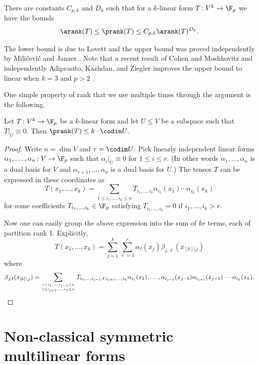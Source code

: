 \begin{thm}
\label{thm:analytic-partition}
There are constants $C_{p,k}$ and $D_k$ such that for a $k$-linear form $T\colon V^k\to\F_p$ we have the bounds
\[\arank(T)\leq\prank(T)\leq C_{p,k}\arank(T)^{D_k}.\]
\end{thm}

The lower bound is due to Lovett \cite{Lov19} and the upper bound was proved independently by Mili\'cevi\'c \cite{Mil19} and Janzer \cite{Jan20}. Note that a recent result of Cohen and Moshkovitz and independently Adiprasito, Kazhdan, and Ziegler improves the upper bound to linear when $k=3$ and $p>2$ \cite{CM21, AKZ21}.

One simple property of rank that we use multiple times through the argument is the following.

\begin{lemma}
\label{thm:close-in-rank}
Let $T\colon V^k\to\F_p$ be a $k$-linear form and let $U\leq V$ be a subspace such that $T|_U\equiv 0$. Then $\prank(T)\leq k\cdot\codim U$.
\end{lemma}

\begin{proof}
Write $n=\dim V$ and $r=\codim U$. Pick linearly independent linear forms $\alpha_1,\ldots,\alpha_n\colon V\to\F_p$ such that $\alpha_i|_U\equiv 0$ for $1\leq i\leq r$. (In other words $\alpha_1,\ldots,\alpha_n$ is a dual basis for $V$ and $\alpha_{r+1},\ldots,\alpha_n$ is a dual basis for $U$.) The tensor $T$ can be expressed in these coordinates as
\[T(x_1,\ldots,x_k)=\sum_{1\leq i_1,\ldots,i_k\leq n}T_{i_1,\ldots,i_k}\alpha_{i_1}(x_1)\cdots\alpha_{i_k}(x_k)\]for some coefficients $T_{i_1,\ldots,i_k}\in \F_p$ satisfying  $T_{i_1,\ldots,i_k}=0$ if $i_1,\ldots,i_k>r$.

Now one can easily group the above expression into the sum of $kr$ terms, each of partition rank 1. Explicitly,
\[T(x_1,\ldots,x_k)=\sum_{j=1}^k\sum_{\ell=1}^r \alpha_\ell(x_j)\beta_{j,\ell}(x_{[k]\setminus j})\]where
\[\beta_{j,\ell}(x_{[k]\setminus j})=\sum_{\genfrac{}{}{0pt}{}{r<i_1,\ldots,i_{j-1}\leq n}{1\leq i_{j+1},\ldots, i_n\leq n}}T_{i_1,\ldots,i_{j-1},\ell,i_{j+1},\ldots,i_k}\alpha_{i_1}(x_1),\ldots,\alpha_{i_{j-1}}(x_{j-1})\alpha_{i_{j+1}}(x_{j+1})\cdots\alpha_{i_k}(x_k).\qedhere\]
\end{proof}

\section{Non-classical symmetric multilinear forms}
\label{sec:ncsm}

